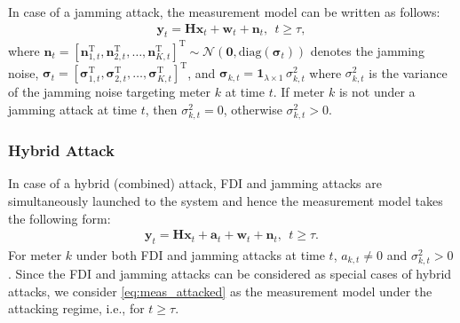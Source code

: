 \documentclass[onecolumn]{IEEEtran}
\begin{document}
In case of a jamming attack, the measurement model can be written as follows:
\begin{gather} \label{eq:jamming_model}
\mathbf{y}_t = \mathbf{H} \mathbf{x}_t + \mathbf{w}_t + \mathbf{n}_t, ~~ t \geq \tau,
\end{gather}
where $\mathbf{n}_t = [\mathbf{n}_{1,t}^\mathrm{T}, \mathbf{n}_{2,t}^\mathrm{T}, \dots, \mathbf{n}_{K,t}^\mathrm{T}]^\mathrm{T} \sim \mathbf{\mathcal{N}}(\mathbf{0}, \mathrm{diag}(\pmb{\sigma}_t))$ denotes the jamming noise, $\pmb{\sigma}_t = [\pmb{\sigma}_{1,t}^\mathrm{T}, \pmb{\sigma}_{2,t}^\mathrm{T}, \dots, \pmb{\sigma}_{K,t}^\mathrm{T}]^\mathrm{T}$, and $\pmb{\sigma}_{k,t} = \mathbf{1}_{\lambda \times 1} \, \sigma_{k,t}^2$ where $\sigma_{k,t}^2$ is the variance of the jamming noise targeting meter $k$ at time $t$. If meter $k$ is not under a jamming attack at time $t$, then $\sigma_{k,t}^2 = 0$, otherwise $\sigma_{k,t}^2 > 0$.

\subsubsection{Hybrid Attack}

In case of a hybrid (combined) attack, FDI and jamming attacks are simultaneously launched to the system and hence the measurement model takes the following form:
\begin{gather} \label{eq:meas_attacked}
\mathbf{y}_t = \mathbf{H} \mathbf{x}_t + \mathbf{a}_t + \mathbf{w}_t + \mathbf{n}_t, ~~ t \geq \tau.
\end{gather}
For meter $k$ under both FDI and jamming attacks at time $t$, $a_{k,t} \neq 0$ and $\sigma_{k,t}^2 > 0$. Since the FDI and jamming attacks can be considered as special cases of hybrid attacks, we consider \eqref{eq:meas_attacked} as the measurement model under the attacking regime, i.e., for $t \geq \tau$.

\end{document}
